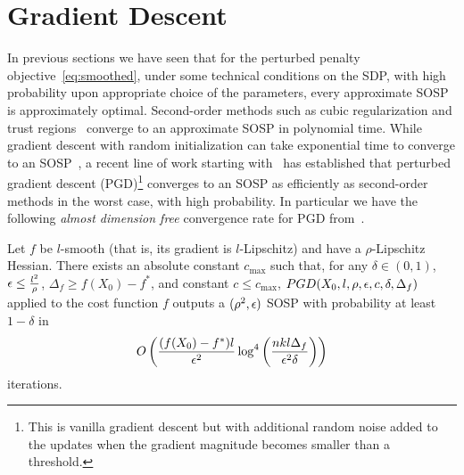 \section{Gradient Descent}\label{sec:gd}
In previous sections we have seen that for the perturbed penalty objective~\eqref{eq:smoothed}, under some technical conditions on the SDP, with high probability upon appropriate choice of the parameters, every approximate SOSP is approximately optimal. Second-order methods such as cubic regularization and trust regions~\citep{nesterov2006cubic,cartis2012complexity} converge to an approximate SOSP in polynomial time.
While gradient descent with random initialization can take exponential time to converge to an SOSP~\citep{du2017gradient}, a recent line of work starting with~\citet{ge2015escaping} has established that perturbed gradient descent (PGD)\footnote{This is vanilla gradient descent but with additional random noise added to the updates when the gradient magnitude becomes smaller than a threshold.} converges to an SOSP as efficiently as second-order methods in the worst case, with high probability. In particular we have the following \emph{almost dimension free} convergence rate for PGD from~\citep{jin2017escape}.

\begin{theorem}
Let $f$ be $l$-smooth (that is, its gradient is $l$-Lipschitz) and have a $\rho$-Lipschitz Hessian. There exists an absolute constant $c_{\max}$ such that, for any $\delta \in (0, 1)$, $\epsilon \leq \frac{l^2}{\rho}$, $\Delta_f \geq f(X_0) -f^*$, and constant $c \leq c_{\max}$, $PGD(X_0,l,\rho,\epsilon,c,\delta,\Delta_f)$ applied to the cost function $f$ outputs a $(\rho^2,\epsilon)$ SOSP with probability at least $1-\delta$ in
$$O \left( \frac{(f(X_0)-f^*)l}{\epsilon^2} \log^4 \left( \frac{nkl \Delta_f}{\epsilon^2 \delta} \right) \right)$$
iterations.
\end{theorem}

